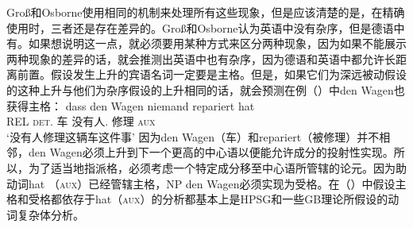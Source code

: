 Groß和Osborne使用相同的机制来处理所有这些现象，但是应该清楚的是，在精确使用时，三者还是存在差异的。Groß和Osborne认为英语中没有杂序，但是德语中有。如果想说明这一点，就必须要用某种方式来区分两种现象，因为如果不能展示两种现象的差异的话，就会推测出英语中也有杂序，因为德语和英语中都允许长距离前置。\citet[]{GO2009a}假设发生上升的宾语名词一定要是主格。但是，如果它们为深远被动假设的这种上升与他们为杂序假设的上升相同的话，就会预测在例（）中den Wagen也获得主格：
\ea
\gll dass den Wagen niemand repariert hat\\
     REL \textsc{det}.\acc{} 车 没有人.\nom{} 修理 \textsc{aux}\\
\glt `没有人修理这辆车这件事'
\z
因为den Wagen（车）和repariert（被修理）并不相邻，den Wagen必须上升到下一个更高的中心语以便能允许成分的投射性实现。所以，为了适当地指派格，必须考虑一个特定成分移至中心语所管辖的论元。因为助动词hat （\textsc{aux}）已经管辖主格，NP den Wagen必须实现为受格。在（）中假设主格和受格都依存于hat（\textsc{aux}）的分析都基本上是HPSG和一些GB理论所假设的动词复杂体分析。


